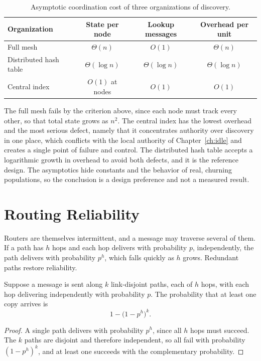 \begin{table}[ht]
\centering
\begin{tabular}{lccc}
\toprule
Organization & State per node & Lookup messages & Overhead per unit \\
\midrule
Full mesh & $\Theta(n)$ & $O(1)$ & $\Theta(n)$ \\
Distributed hash table & $\Theta(\log n)$ & $\Theta(\log n)$ & $\Theta(\log n)$ \\
Central index & $O(1)$ at nodes & $O(1)$ & $O(1)$ \\
\bottomrule
\end{tabular}
\caption{Asymptotic coordination cost of three organizations of discovery.}
\label{tab:coordination}
\end{table}

The full mesh fails by the criterion above, since each node must track every other, so that total state grows as $n^{2}$. The central index has the lowest overhead and the most serious defect, namely that it concentrates authority over discovery in one place, which conflicts with the local authority of Chapter~\ref{ch:idle} and creates a single point of failure and control. The distributed hash table accepts a logarithmic growth in overhead to avoid both defects, and it is the reference design. The asymptotics hide constants and the behavior of real, churning populations, so the conclusion is a design preference and not a measured result.

\section{Routing Reliability}

Routers are themselves intermittent, and a message may traverse several of them. If a path has $h$ hops and each hop delivers with probability $p$, independently, the path delivers with probability $p^{h}$, which falls quickly as $h$ grows. Redundant paths restore reliability.

\begin{proposition}
\label{prop:routes}
Suppose a message is sent along $k$ link-disjoint paths, each of $h$ hops, with each hop delivering independently with probability $p$. The probability that at least one copy arrives is
\[
1-\bigl(1-p^{h}\bigr)^{k}.
\]
\end{proposition}

\begin{proof}
A single path delivers with probability $p^{h}$, since all $h$ hops must succeed. The $k$ paths are disjoint and therefore independent, so all fail with probability $(1-p^{h})^{k}$, and at least one succeeds with the complementary probability.
\end{proof}

